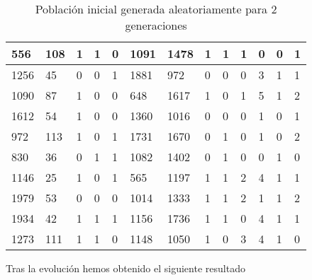 \begin{table}[H]
\begin{tabular}{|l|l|l|l|l|l|l|l|l|l|l|l|l|}
556        & 108        & 1          & 1          & 0          & 1091       & 1478       & 1          & 1          & 1           & 0           & 0           & 1           \\ \hline
1256       & 45         & 0          & 0          & 1          & 1881       & 972        & 0          & 0          & 0           & 3           & 1           & 1           \\ \hline
1090       & 87         & 1          & 0          & 0          & 648        & 1617       & 1          & 0          & 1           & {\color[HTML]{FE0000}5}           & 1           & 2           \\ \hline
1612       & 54         & 1          & 0          & 0          & 1360       & 1016       & 0          & 0          & 0           & 1           & 0           & 1           \\ \hline
972        & 113        & 1          & 0          & 1          & 1731       & 1670       & 0          & 1          & 0           & 1           & 0           & 2           \\ \hline
830        & 36         & 0          & 1          & 1          & 1082       & 1402       & 0          & 1          & 0           & 0           & 1           & 0           \\ \hline
1146       & 25         & 1          & 0          & 1          & 565        & 1197       & 1          & 1          & 2           & 4           & 1           & 1           \\ \hline
1979       & 53         & 0          & 0          & 0          & 1014       & 1333       & 1          & 1          & 2           & 1           & 1           & 2           \\ \hline
1934       & 42         & 1          & 1          & 1          & 1156       & 1736       & 1          & 1          & 0           & 4           & 1           & 1           \\ \hline
1273       & 111        & 1          & 1          & 0          & 1148       & 1050       & 1          & 0          & {\color[HTML]{FE0000}3}           & 4           & 1           & 0           \\ \hline
\end{tabular}
\caption{Población inicial generada aleatoriamente para 2 generaciones}
\end{table}

Tras la evolución hemos obtenido el siguiente resultado

